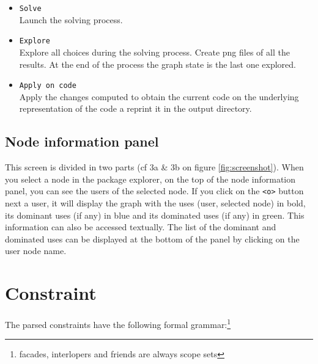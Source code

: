 \documentclass[]{article}
\begin{document}
\begin{itemize}
	\item \verb|Solve|\\
	Launch the solving process.
	
	\item \verb|Explore|\\
	Explore all choices during the solving process. Create png files of all the results. At the end of the process the graph state is the last one explored.
	
	\item \verb|Apply on code|\\
	Apply the changes computed to obtain the current code on the underlying representation of the code a reprint it in the output directory.
	
\end{itemize}

\subsection{Node information panel}
This screen is divided in two parts (cf 3a \& 3b on figure \ref{fig:screenshot}).
When you select a node in the package explorer, on the top of the node information panel, you can see the users of the selected node. If you click on the \verb|<o>| button next a user, it will display the graph with the uses (user, selected node) in bold, its dominant uses (if any) in blue and its dominated uses (if any) in green.
This information can also be accessed textually. The list of the dominant and dominated uses can be displayed at the bottom of the panel by clicking on the user node name.

\section{Constraint}
The parsed constraints have the following formal grammar:\footnote{facades, interlopers and friends are always scope sets}
\end{document}
